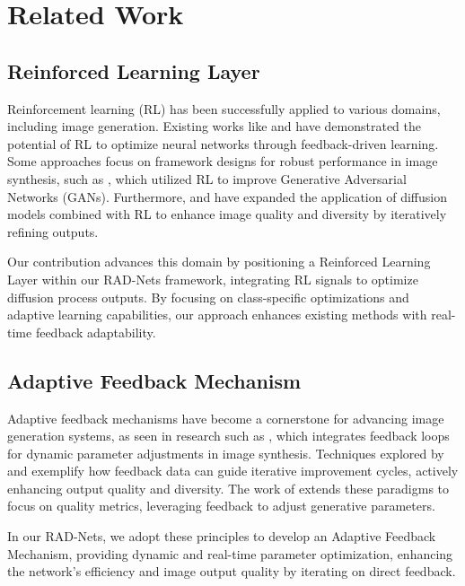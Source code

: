 \section{Related Work}

\subsection{Reinforced Learning Layer}

Reinforcement learning (RL) has been successfully applied to various domains, including image generation. Existing works like \cite{lillicrap2015continuous} and \cite{mnih2016asynchronous} have demonstrated the potential of RL to optimize neural networks through feedback-driven learning. Some approaches focus on framework designs for robust performance in image synthesis, such as \cite{wang2019reinforced}, which utilized RL to improve Generative Adversarial Networks (GANs). Furthermore, \cite{song2020score} and \cite{ho2020denoising} have expanded the application of diffusion models combined with RL to enhance image quality and diversity by iteratively refining outputs. 

Our contribution advances this domain by positioning a Reinforced Learning Layer within our RAD-Nets framework, integrating RL signals to optimize diffusion process outputs. By focusing on class-specific optimizations and adaptive learning capabilities, our approach enhances existing methods with real-time feedback adaptability.

\subsection{Adaptive Feedback Mechanism}

Adaptive feedback mechanisms have become a cornerstone for advancing image generation systems, as seen in research such as \cite{schmidt2019dynamic}, which integrates feedback loops for dynamic parameter adjustments in image synthesis. Techniques explored by \cite{singh2018feedback} and \cite{schwarz2018progressive} exemplify how feedback data can guide iterative improvement cycles, actively enhancing output quality and diversity. The work of \cite{salimans2016improved} extends these paradigms to focus on quality metrics, leveraging feedback to adjust generative parameters. 

In our RAD-Nets, we adopt these principles to develop an Adaptive Feedback Mechanism, providing dynamic and real-time parameter optimization, enhancing the network's efficiency and image output quality by iterating on direct feedback.

